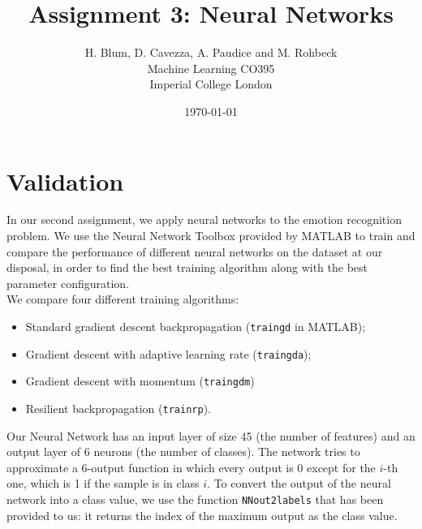 \documentclass{article}
\begin{document}
\author{H. Blum, D. Cavezza, A. Paudice and M. Rohbeck\\
 Machine Learning CO395\\
  Imperial College London}
\date{\today}
\title{Assignment 3: Neural Networks}
\maketitle

\section{Validation}
In our second assignment, we apply neural networks to the emotion recognition problem. We use the Neural Network Toolbox provided by MATLAB to train and compare the performance of different neural networks on the dataset at our disposal, in order to find the best training algorithm along with the best parameter configuration.\\
We compare four different training algorithms:
\begin{itemize}
	\item Standard gradient descent backpropagation (\verb$traingd$ in MATLAB);
	\item Gradient descent with adaptive learning rate (\verb$traingda$);
	\item Gradient descent with momentum (\verb$traingdm$)
	\item Resilient backpropagation (\verb$trainrp$).
\end{itemize}

Our Neural Network has an input layer of size 45 (the number of features) and an output layer of 6 neurons (the number of classes). The network tries to approximate a 6-output function in which every output is 0 except for the $i$-th one, which is 1 if the sample is in class $i$. To convert the output of the neural network into a class value, we use the function \verb$NNout2labels$ that has been provided to us: it returns the index of the maximum output as the class value.
\end{document}

